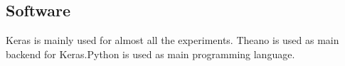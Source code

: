 \subsection{Software}
Keras \cite{chollet2015} is mainly used for almost all the experiments. Theano \cite{2016arXiv160502688short} is used as main backend for Keras.Python is used as main programming language.




